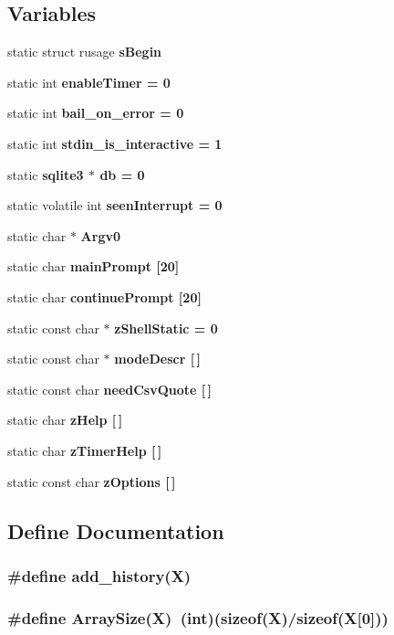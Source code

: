 \subsection*{Variables}
\begin{CompactItemize}
\item 
static struct rusage \bf{s\-Begin}
\item 
static int \bf{enable\-Timer} = 0
\item 
static int \bf{bail\_\-on\_\-error} = 0
\item 
static int \bf{stdin\_\-is\_\-interactive} = 1
\item 
static \bf{sqlite3} $\ast$ \bf{db} = 0
\item 
static volatile int \bf{seen\-Interrupt} = 0
\item 
static char $\ast$ \bf{Argv0}
\item 
static char \bf{main\-Prompt} [20]
\item 
static char \bf{continue\-Prompt} [20]
\item 
static const char $\ast$ \bf{z\-Shell\-Static} = 0
\item 
static const char $\ast$ \bf{mode\-Descr} [$\,$]
\item 
static const char \bf{need\-Csv\-Quote} [$\,$]
\item 
static char \bf{z\-Help} [$\,$]
\item 
static char \bf{z\-Timer\-Help} [$\,$]
\item 
static const char \bf{z\-Options} [$\,$]
\end{CompactItemize}


\subsection{Define Documentation}
\subsubsection{\setlength{\rightskip}{0pt plus 5cm}\#define add\_\-history(X)}\label{shell_8c_829b1d1666a6724e57520cfcff4beeb3}


\subsubsection{\setlength{\rightskip}{0pt plus 5cm}\#define Array\-Size(X)~(int)(sizeof(X)/sizeof(X[0]))}\label{shell_8c_390beda80f7cb63d92fdbf9782364a4f}



